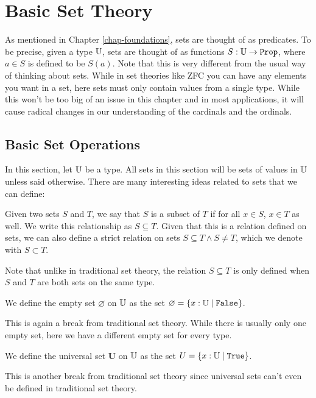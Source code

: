 \documentclass[../math.tex]{subfiles}
\begin{document}
\setcounter{chapter}{3}

\chapter{Basic Set Theory} \label{chap-set}

As mentioned in Chapter \ref{chap-foundations}, sets are thought of as
predicates.  To be precise, given a type $\mathbb{U}$, sets are thought of as functions
$S : \U \rightarrow \vtt{Prop}$, where $a \in S$ is defined to be $S(a)$.  Note
that this is very different from the usual way of thinking about sets.  While in
set theories like ZFC you can have any elements you want in a set, here sets
must only contain values from a single type.  While this won't be too big of an
issue in this chapter and in most applications, it will cause radical changes in
our understanding of the cardinals and the ordinals.

\section{Basic Set Operations}

In this section, let $\mathbb{U}$ be a type.  All sets in this section will be sets of
values in $\mathbb{U}$ unless said otherwise.  There are many interesting ideas related
to sets that we can define:

\begin{definition}
    Given two sets $S$ and $T$, we say that $S$ is a subset of $T$ if for all $x
    \in S$, $x \in T$ as well.  We write this relationship as $S \subseteq T$.
    Given that this is a relation defined on sets, we can also define a strict
    relation on sets $S \subseteq T \wedge S \neq T$, which we denote with $S
    \subset T$.
\end{definition}
\noindent Note that unlike in traditional set theory, the relation $S \subseteq
T$ is only defined when $S$ and $T$ are both sets on the same type.

\begin{definition}
    We define the empty set $\varnothing$ on $\mathbb{U}$ as the set $\varnothing = \{x
    : \U \mid \vtt{False}\}$.
\end{definition}
\noindent This is again a break from traditional set theory.  While there is
usually only one empty set, here we have a different empty set for every type.

\begin{definition}
    We define the universal set $\bm U$ on $\mathbb{U}$ as the set $U = \{x : \U \mid
    \vtt{True}\}$.
\end{definition}
\noindent This is another break from traditional set theory since universal sets
can't even be defined in traditional set theory.
\end{document}
